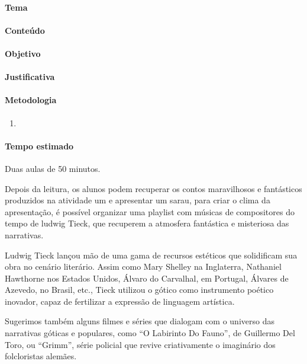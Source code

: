 \documentclass[11pt]{extarticle}
\begin{document}
\paragraph{Tema}

\paragraph{Conteúdo}

\paragraph{Objetivo}

\paragraph{Justificativa}

\paragraph{Metodologia}
\begin{enumerate}

\item 

\end{enumerate}

\paragraph{Tempo estimado} Duas aulas de 50 minutos. 

Depois da leitura, os alunos podem recuperar os contos
maravilhosos e fantásticos produzidos na atividade um e apresentar um
sarau, para criar o clima da apresentação, é possível organizar uma
playlist com músicas de compositores do tempo de ludwig Tieck, que
recuperem a atmosfera fantástica e misteriosa das narrativas.

Ludwig Tieck lançou mão de uma gama de recursos estéticos que
solidificam sua obra no cenário literário. Assim como Mary Shelley na
Inglaterra, Nathaniel Hawthorne nos Estados Unidos, Álvaro do Carvalhal,
em Portugal, Álvares de Azevedo, no Brasil, etc., Tieck utilizou o
gótico como instrumento poético inovador, capaz de fertilizar a
expressão de linguagem artística.

Sugerimos também alguns filmes e séries que dialogam com o universo das
narrativas góticas e populares, como ``O Labirinto Do Fauno'', de
Guillermo Del Toro, ou ``Grimm'', série policial que revive
criativamente o imaginário dos folcloristas alemães.
\end{document}
